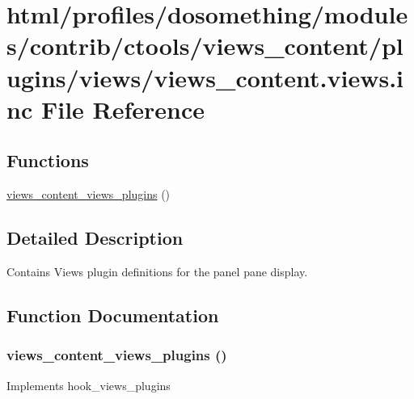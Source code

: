 \hypertarget{views__content_8views_8inc}{
\section{html/profiles/dosomething/modules/contrib/ctools/views\_\-content/plugins/views/views\_\-content.views.inc File Reference}
\label{views__content_8views_8inc}
}
\subsection*{Functions}
\begin{DoxyCompactItemize}
\item 
\hyperlink{views__content_8views_8inc_a22d3d3c29071258ca2d6c174608c5cb3}{views\_\-content\_\-views\_\-plugins} ()
\end{DoxyCompactItemize}


\subsection{Detailed Description}
Contains Views plugin definitions for the panel pane display. 

\subsection{Function Documentation}
\hypertarget{views__content_8views_8inc_a22d3d3c29071258ca2d6c174608c5cb3}{
\subsubsection[{views\_\-content\_\-views\_\-plugins}]{\setlength{\rightskip}{0pt plus 5cm}views\_\-content\_\-views\_\-plugins ()}}
\label{views__content_8views_8inc_a22d3d3c29071258ca2d6c174608c5cb3}
Implements hook\_\-views\_\-plugins 